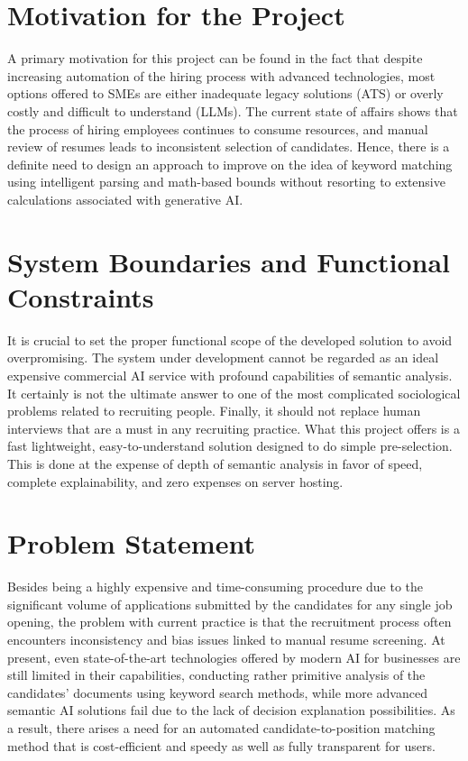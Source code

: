 \section{Motivation for the Project}
A primary motivation for this project can be found in the fact that despite increasing automation of the hiring process with advanced technologies, most options offered to SMEs are either inadequate legacy solutions (ATS) or overly costly and difficult to understand (LLMs). The current state of affairs shows that the process of hiring employees continues to consume resources, and manual review of resumes leads to inconsistent selection of candidates. Hence, there is a definite need to design an approach to improve on the idea of keyword matching using intelligent parsing and math-based bounds without resorting to extensive calculations associated with generative AI.

\section{System Boundaries and Functional Constraints}
It is crucial to set the proper functional scope of the developed solution to avoid overpromising. The system under development cannot be regarded as an ideal expensive commercial AI service with profound capabilities of semantic analysis. It certainly is not the ultimate answer to one of the most complicated sociological problems related to recruiting people. Finally, it should not replace human interviews that are a must in any recruiting practice. What this project offers is a fast lightweight, easy-to-understand solution designed to do simple pre-selection. This is done at the expense of depth of semantic analysis in favor of speed, complete explainability, and zero expenses on server hosting.

\section{Problem Statement}
Besides being a highly expensive and time-consuming procedure due to the significant volume of applications submitted by the candidates for any single job opening, the problem with current practice is that the recruitment process often encounters inconsistency and bias issues linked to manual resume screening. At present, even state-of-the-art technologies offered by modern AI for businesses are still limited in their capabilities, conducting rather primitive analysis of the candidates' documents using keyword search methods, while more advanced semantic AI solutions fail due to the lack of decision explanation possibilities. As a result, there arises a need for an automated candidate-to-position matching method that is cost-efficient and speedy as well as fully transparent for users.

